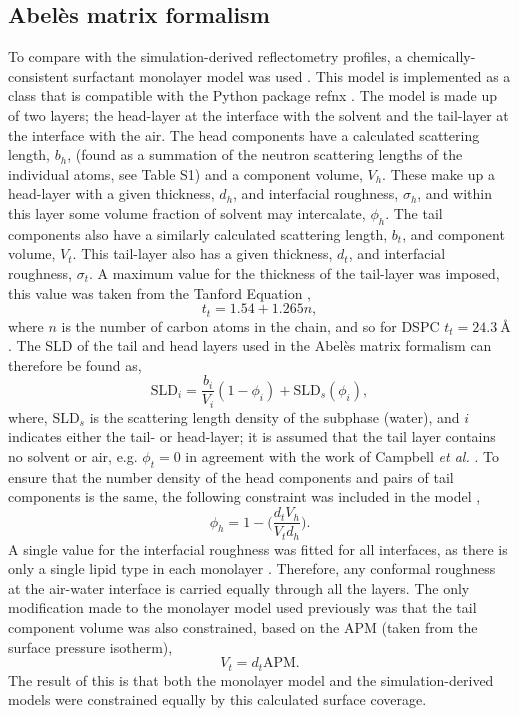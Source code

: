 \documentclass[amsmath,amssymb,twocolumn,superscriptaddress]{revtex4-1}
\begin{document}
\subsection{Abel\`{e}s matrix formalism}
To compare with the simulation-derived reflectometry profiles, a
chemically-consistent surfactant monolayer model was
used \cite{mccluskey_bayesian_2019,mccluskey_lipids_at_airdes_2019}.
This model is implemented as a class that is compatible with the Python
package refnx \cite{nelson_refnx_2019,nelson_refnx_2018}.
The model is made up of two layers; the head-layer at the interface with
the solvent and the tail-layer at the interface with the air.
The head components have a calculated scattering length, $b_h$, (found as a
summation of the neutron scattering lengths of the individual atoms, see
Table S1) and a component volume, $V_h$.
These make up a head-layer with a given thickness, $d_h$, and interfacial
roughness, $\sigma_h$, and within this layer some volume fraction of
solvent may intercalate, $\phi_h$.
The tail components also have a similarly calculated scattering
length, $b_t$, and component volume, $V_t$.
This tail-layer also has a given thickness, $d_t$, and interfacial
roughness, $\sigma_t$.
A maximum value for the thickness of the tail-layer was imposed, this
value was taken from the Tanford Equation \cite{tanford_hydrophobic_1980},
%
\begin{equation}
  t_t = 1.54 + 1.265n,
\end{equation}
%
where $n$ is the number of carbon atoms in the chain, and so for
DSPC $t_t = \SI{24.3}{\angstrom}$.
The SLD of the tail and head layers used in the Abel\`{e}s matrix formalism
can therefore be found as,
%
\begin{equation}
  \text{SLD}_i = \frac{b_i}{V_i}(1 - \phi_i) + \text{SLD}_s(\phi_i),
\end{equation}
%
where, $\text{SLD}_s$ is the scattering length density of the subphase
(water), and $i$ indicates either the tail- or head-layer; it is assumed
that the tail layer contains no solvent or air, e.g. $\phi_t = 0$ in
agreement with the work of
Campbell \emph{et al.} \cite{campbell_structure_2018}.
To ensure that the number density of the head components and pairs of tail
components is the same, the following constraint was included in the
model \cite{braun_polymers_2017},
%
\begin{equation}
  \phi_h = 1 - \bigg(\frac{d_tV_h}{V_td_h}\bigg).
\end{equation}
%
A single value for the interfacial roughness was fitted for all interfaces, as
there is only a single lipid type in each
monolayer \cite{campbell_structure_2018}.
Therefore, any conformal roughness at the air-water interface is carried
equally through all the layers.
The only modification made to the monolayer model used previously was that
the tail component volume was also constrained, based on the APM (taken
from the surface pressure isotherm),
%
\begin{equation}
  V_t = d_t \text{APM}.
\end{equation}
%
The result of this is that both the monolayer model and the
simulation-derived models were constrained equally by this calculated
surface coverage.
\end{document}
